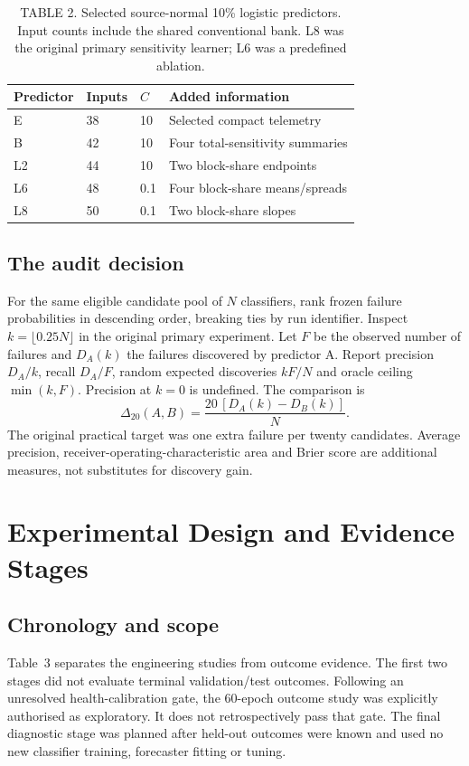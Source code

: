 \begin{table}[t]
\caption{TABLE 2. Selected source-normal 10\% logistic predictors. Input counts include the shared conventional bank. L8 was the original primary sensitivity learner; L6 was a predefined ablation.}
\label{tab:learners}
\centering\small
\begin{tabular}{llll}
\toprule Predictor & Inputs & $C$ & Added information\\\midrule
E &38&10&Selected compact telemetry\\
B &42&10&Four total-sensitivity summaries\\
L2&44&10&Two block-share endpoints\\
L6&48&0.1&Four block-share means/spreads\\
L8&50&0.1&Two block-share slopes\\\bottomrule
\end{tabular}
\end{table}

\subsection{The audit decision}
For the same eligible candidate pool of $N$ classifiers, rank frozen failure probabilities in descending order, breaking ties by run identifier. Inspect $k=\lfloor0.25N\rfloor$ in the original primary experiment. Let $F$ be the observed number of failures and $D_A(k)$ the failures discovered by predictor A. Report precision $D_A/k$, recall $D_A/F$, random expected discoveries $kF/N$ and oracle ceiling $\min(k,F)$. Precision at $k=0$ is undefined. The comparison is
\begin{equation}
\Delta_{20}(A,B)=\frac{20\,[D_A(k)-D_B(k)]}{N}.
\label{eq:gain}
\tag{7}\end{equation}
The original practical target was one extra failure per twenty candidates. Average precision, receiver-operating-characteristic area and Brier score are additional measures, not substitutes for discovery gain.

\section{Experimental Design and Evidence Stages}
\label{sec:experiments}
\subsection{Chronology and scope}
Table~3 separates the engineering studies from outcome evidence. The first two stages did not evaluate terminal validation/test outcomes. Following an unresolved health-calibration gate, the 60-epoch outcome study was explicitly authorised as exploratory. It does not retrospectively pass that gate. The final diagnostic stage was planned after held-out outcomes were known and used no new classifier training, forecaster fitting or tuning.

